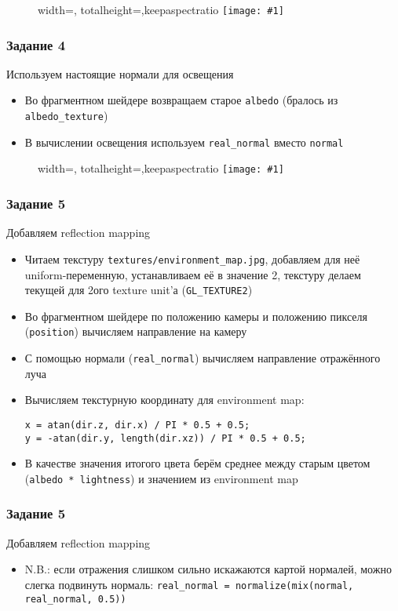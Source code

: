 \documentclass{beamer}
\newcommand{\slideimage}[1]{
  \begin{figure}
    \begin{adjustbox}{width=\textwidth, totalheight=\textheight-2\baselineskip-2\baselineskip,keepaspectratio}
      \texttt{[image: \#1]}
    \end{adjustbox}
  \end{figure}
}
\begin{document}
\begin{frame}[fragile]
\slideimage{3.png}
\end{frame}

\begin{frame}[fragile]
\frametitle{Задание 4}
Используем настоящие нормали для освещения
\begin{itemize}
\item Во фрагментном шейдере возвращаем старое \verb|albedo| (бралось из \verb|albedo_texture|)
\item В вычислении освещения используем \verb|real_normal| вместо \verb|normal|
\end{itemize}
\end{frame}

\begin{frame}[fragile]
\slideimage{4.png}
\end{frame}

\begin{frame}[fragile]
\frametitle{Задание 5}
Добавляем reflection mapping
\begin{itemize}
\item Читаем текстуру \verb|textures/environment_map.jpg|, добавляем для неё uniform-переменную, устанавливаем её в значение 2, текстуру делаем текущей для 2ого texture unit'а (\verb|GL_TEXTURE2|)
\item Во фрагментном шейдере по положению камеры и положению пикселя (\verb|position|) вычисляем направление на камеру
\item С помощью нормали (\verb|real_normal|) вычисляем направление отражённого луча
\item Вычисляем текстурную координату для environment map:
\begin{verbatim}
x = atan(dir.z, dir.x) / PI * 0.5 + 0.5;
y = -atan(dir.y, length(dir.xz)) / PI * 0.5 + 0.5;
\end{verbatim}
\item В качестве значения итогого цвета берём среднее между старым цветом (\verb|albedo * lightness|) и значением из environment map
\end{itemize}
\end{frame}

\begin{frame}[fragile]
\frametitle{Задание 5}
Добавляем reflection mapping
\begin{itemize}
\item N.B.: если отражения слишком сильно искажаются картой нормалей, можно слегка подвинуть нормаль: \verb|real_normal = normalize(mix(normal, real_normal, 0.5))|
\end{itemize}
\end{frame}
\end{document}
